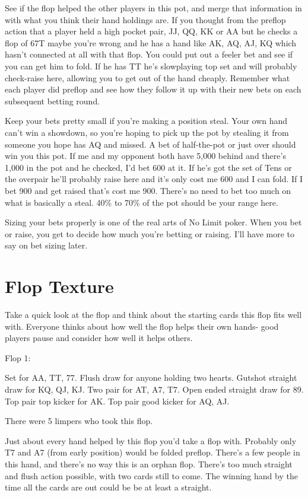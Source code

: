 See if the flop helped the other players in this pot, and merge
that information in with what you think their hand holdings are.
If you thought from the preflop action that a player held a high
pocket pair, JJ, QQ, KK or AA but he checks a flop of 67T maybe
you're wrong and he has a hand like AK, AQ, AJ, KQ which hasn't connected
at all with that flop. You could put out a feeler bet and see if
you can get him to fold. If he has TT he's slowplaying top set and
will probably check-raise here, allowing you to get out of the hand
cheaply. Remember what each player did preflop and see how they
follow it up with their new bets on each subsequent betting round.

Keep your bets pretty small if you're making a position steal. Your own
hand can't win a showdown, so you're hoping to pick up the pot
by stealing it from someone you hope has AQ and missed. A bet
of half-the-pot or just over should win you this pot. If me and
my opponent both have 5,000 behind and there's 1,000 in the pot
and he checked, I'd bet 600 at it. If he's got the set of Tens or
the overpair he'll probably raise here and it's only cost me 600
and I can fold. If I bet 900 and get raised that's
cost me 900. There's no need to bet too much on what is basically
a steal. 40\% to 70\% of the pot should be your range here.

Sizing your bets properly is one of the real arts of No Limit poker.
When you bet or raise, you get to decide how much you're betting
or raising. I'll have more to say on bet sizing later.

\section{Flop Texture}

Take a quick look at the flop and think about the starting cards this
flop fits well with. Everyone thinks about how well the flop helps
their own hands- good players pause and consider how well it helps others.

Flop 1: \Ah\tenh\sevs

Set for AA, TT, 77. Flush draw for anyone holding two hearts.
Gutshot straight draw for KQ, QJ, KJ. Two pair for AT, A7, T7.
Open ended straight draw for 89. Top pair top kicker for AK. Top pair
good kicker for AQ, AJ.

There were 5 limpers who took this flop.

Just about every hand helped by this flop you'd take a flop with.
Probably only T7 and A7 (from early position) would be folded preflop.
There's a few people in this hand, and there's no way this is an orphan
flop. There's too much straight and flush action possible, with two
cards still to come. The winning hand by the time all the cards are
out could be be at least a straight.

